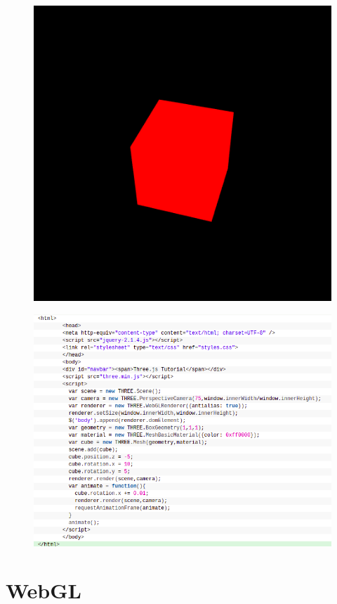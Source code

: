\documentclass[a4paper, 12pt]{book}
\begin{document}
\begin{figure}
\centering
 \includegraphics[scale=0.5]{img/threejs-renderizadocubo.png}
\end{figure}

\begin{figure}
\centering
 \includegraphics[scale=0.6]{img/codigoThree.png}
\end{figure}


\newpage
\section{WebGL} 
\label{sec:WebGL}
\end{document}
